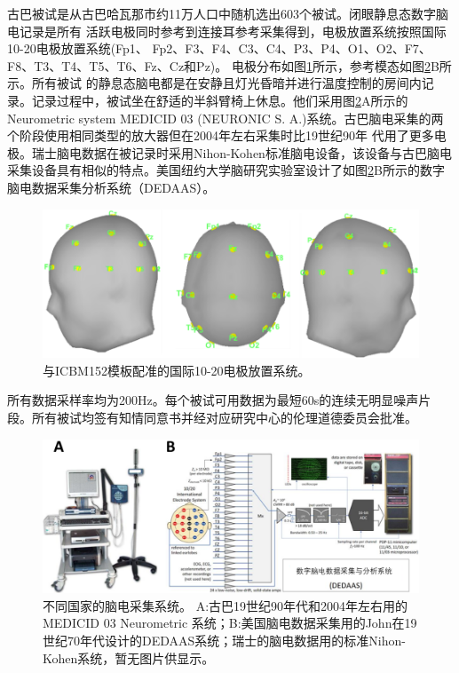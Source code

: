 古巴被试是从古巴哈瓦那市约11万人口中随机选出603个被试。闭眼静息态数字脑电记录是所有
活跃电极同时参考到连接耳参考采集得到，电极放置系统按照国际10-20电极放置系统(Fp1、
Fp2、F3、F4、C3、C4、P3、P4、O1、O2、F7、F8、T3、T4、T5、T6、Fz、Cz和Pz)。 电极分布如图\ref{6:ele}所示，参考模态如图\ref{6:amp}B所示。所有被试
的静息态脑电都是在安静且灯光昏暗并进行温度控制的房间内记录。记录过程中，被试坐在舒适的半斜臂椅上休息。他们采用图\ref{6:amp}A所示的
Neurometric system MEDICID 03 (NEURONIC S. A.)系统。古巴脑电采集的两个阶段使用相同类型的放大器但在2004年左右采集时比19世纪90年
代用了更多电极。瑞士脑电数据在被记录时采用Nihon-Kohen标准脑电设备，该设备与古巴脑电采集设备具有相似的特点。美国纽约大学脑研究实验室设计了如图\ref{6:amp}B所示的数字脑电数据采集分析系统（DEDAAS）。
\begin{figure}[!h]
\includegraphics[width=13cm]{pic/Norm/figure2.png}
\caption{与ICBM152模板配准的国际10-20电极放置系统。}
\label{6:ele}
\end{figure}
所有数据采样率均为200Hz。每个被试可用数据为最短60s的连续无明显噪声片段。所有被试均签有知情同意书并经对应研究中心的伦理道德委员会批准。
\begin{figure}[!h]
\includegraphics[width=15cm]{pic/Norm/figure3.png}
\caption{不同国家的脑电采集系统。 A:古巴19世纪90年代和2004年左右用的MEDICID 03 Neurometric 系统；B:美国脑电数据采集用的John在19
世纪70年代设计的DEDAAS系统；瑞士的脑电数据用的标准Nihon-Kohen系统，暂无图片供显示。}
\label{6:amp}
\end{figure}

